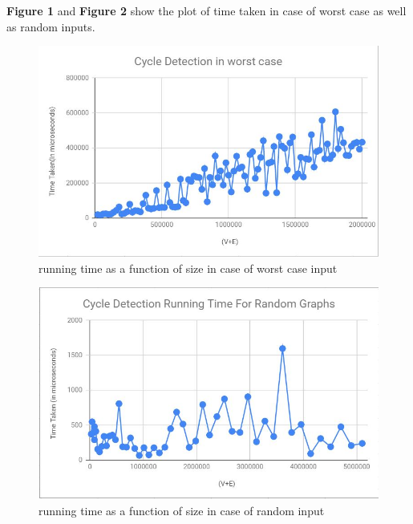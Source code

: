 \documentclass[12pt,letterpaper]{article}
\begin{document}
\textbf{Figure 1} and \textbf{Figure 2} show the plot of time taken in case of worst case as well as random inputs.
\begin{figure}[!h]
\centering
\includegraphics[width=0.5\linewidth]{cycle_worst_case.JPG}
\caption{running time as a function of size in case of worst case input}
\end{figure}
\begin{figure}[!h]
\centering
\includegraphics[width=0.5\linewidth]{rand_cyc.JPG}
\caption{running time as a function of size in case of random input}
\end{figure}
\newpage
\end{document}
